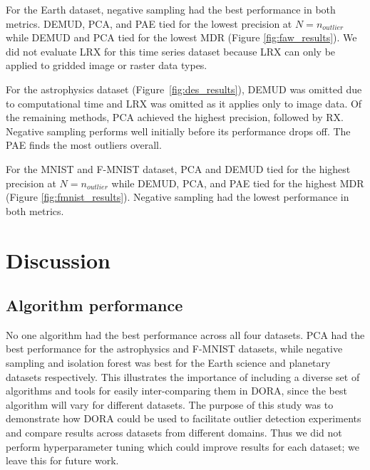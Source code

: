 \documentclass[utf8]{frontiersFPHY} %
\begin{document}
For the Earth dataset, negative sampling had the best performance
in both metrics. DEMUD, PCA, and PAE tied for the lowest precision at 
$N=n_{outlier}$ while DEMUD and PCA tied for the lowest
MDR (Figure \ref{fig:faw_results}). We did not evaluate LRX for this time 
series dataset because LRX can only be applied to gridded image or raster 
data types.

For the astrophysics dataset (Figure~\ref{fig:des_results}), DEMUD was omitted due to computational time 
and LRX was omitted as it applies only to image data.  Of the remaining methods, 
PCA achieved the highest precision, followed by RX.  Negative sampling 
performs well initially before its performance drops off.  The PAE finds the most outliers 
overall.  

For the MNIST and F-MNIST dataset, PCA and DEMUD tied for the highest
precision at $N=n_{outlier}$
while DEMUD, PCA, and PAE tied for the highest MDR 
(Figure \ref{fig:fmnist_results}). 
Negative sampling had the 
lowest performance in both metrics. 


\section{Discussion}

\subsection{Algorithm performance} 
No one algorithm  
had the best performance across all four datasets. PCA had
the best performance for the astrophysics and F-MNIST datasets, 
while negative sampling and isolation forest was best for
the Earth science and planetary datasets respectively. This illustrates
the importance of including a diverse set of algorithms and tools for
easily inter-comparing them in DORA, since the best
algorithm will vary for different datasets. The purpose of this study
was to demonstrate how DORA could be used to facilitate 
outlier detection experiments and compare results across datasets from 
different domains. Thus we did not perform hyperparameter tuning which
could improve results for each dataset; we leave this for future work.
\end{document}
